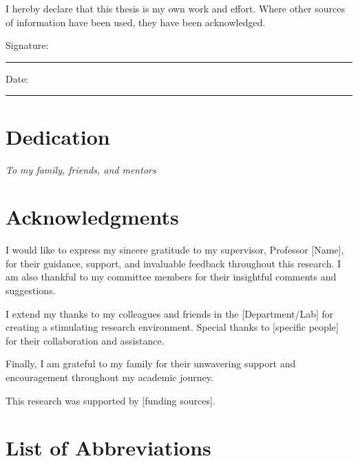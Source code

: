 \documentclass[12pt, oneside]{book}
\theoremstyle{definition}
\theoremstyle{remark}
\begin{document}
I hereby declare that this thesis is my own work and effort. Where other sources 
of information have been used, they have been acknowledged.

\vspace{2cm}

Signature: \rule{5cm}{0.4pt}

\vspace{0.5cm}

Date: \rule{5cm}{0.4pt}

\chapter*{Dedication}

\vspace{2cm}
\begin{center}
    \textit{To my family, friends, and mentors}
\end{center}

\chapter*{Acknowledgments}

I would like to express my sincere gratitude to my supervisor, Professor [Name], 
for their guidance, support, and invaluable feedback throughout this research. 
I am also thankful to my committee members for their insightful comments and 
suggestions.

I extend my thanks to my colleagues and friends in the [Department/Lab] for 
creating a stimulating research environment. Special thanks to [specific people] 
for their collaboration and assistance.

Finally, I am grateful to my family for their unwavering support and encouragement 
throughout my academic journey.

This research was supported by [funding sources].

\tableofcontents

\listoffigures

\listoftables


\chapter*{List of Abbreviations}
\end{document}

